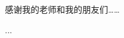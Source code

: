 \documentclass[lang=chs, degree=master, blindreview=false, adobe=false]{yanputhesis}
\begin{document}
\cleardoublepage
\appendix

\backmatter                                                 %
\begin{acknowledgements}                                    %
感谢我的老师和我的朋友们……
\end{acknowledgements}                                      %
\begin{accomplishments}                                     %
    [1] ...
\end{accomplishments}                                       %
\makestatement                                              %
\end{document}
